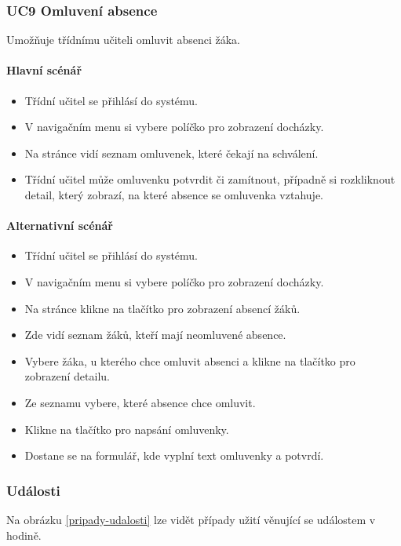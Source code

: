 \subsubsection*{UC9 Omluvení absence}
Umožňuje třídnímu učiteli omluvit absenci žáka.
\paragraph{Hlavní scénář}
\begin{itemize}
    \item Třídní učitel se přihlásí do systému.
    \item V navigačním menu si vybere políčko pro zobrazení docházky.
    \item Na stránce vidí seznam omluvenek, které čekají na schválení.
    \item Třídní učitel může omluvenku potvrdit či zamítnout, případně si rozkliknout detail, který zobrazí, na které absence se omluvenka vztahuje.
\end{itemize}

\paragraph{Alternativní scénář}
\begin{itemize}
    \item Třídní učitel se přihlásí do systému.
    \item V navigačním menu si vybere políčko pro zobrazení docházky.
    \item Na stránce klikne na tlačítko pro zobrazení absencí žáků.
    \item Zde vidí seznam žáků, kteří mají neomluvené absence.
    \item Vybere žáka, u kterého chce omluvit absenci a klikne na tlačítko pro zobrazení detailu.
    \item Ze seznamu vybere, které absence chce omluvit.
    \item Klikne na tlačítko pro napsání omluvenky.
    \item Dostane se na formulář, kde vyplní text omluvenky a potvrdí.
\end{itemize}

\subsubsection{Události}
Na obrázku \ref{pripady-udalosti} lze vidět případy užití věnující se událostem v hodině.

